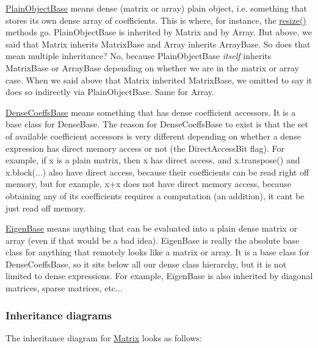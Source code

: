 \begin{DoxyItemize}
\item \hyperlink{class_eigen_1_1_plain_object_base}{Plain\+Object\+Base} means dense (matrix or array) plain object, i.\+e. something that stores its own dense array of coefficients. This is where, for instance, the \hyperlink{class_eigen_1_1_plain_object_base_a99d9054ee2d5a40c6e00ded0265e9cea}{resize() } methods go. {\ttfamily Plain\+Object\+Base} is inherited by {\ttfamily Matrix} and by {\ttfamily Array}. But above, we said that {\ttfamily Matrix} inherits {\ttfamily Matrix\+Base} and {\ttfamily Array} inherits {\ttfamily Array\+Base}. So does that mean multiple inheritance? No, because {\ttfamily Plain\+Object\+Base} {\itshape itself} inherits {\ttfamily Matrix\+Base} or {\ttfamily Array\+Base} depending on whether we are in the matrix or array case. When we said above that {\ttfamily Matrix} inherited {\ttfamily Matrix\+Base}, we omitted to say it does so indirectly via {\ttfamily Plain\+Object\+Base}. Same for {\ttfamily Array}.
\item \hyperlink{class_eigen_1_1_dense_coeffs_base}{Dense\+Coeffs\+Base} means something that has dense coefficient accessors. It is a base class for {\ttfamily Dense\+Base}. The reason for {\ttfamily Dense\+Coeffs\+Base} to exist is that the set of available coefficient accessors is very different depending on whether a dense expression has direct memory access or not (the {\ttfamily Direct\+Access\+Bit} flag). For example, if {\ttfamily x} is a plain matrix, then {\ttfamily x} has direct access, and {\ttfamily x.\+transpose()} and {\ttfamily x.\+block}(...) also have direct access, because their coefficients can be read right off memory, but for example, {\ttfamily x+x} does not have direct memory access, because obtaining any of its coefficients requires a computation (an addition), it can\textquotesingle{}t be just read off memory.
\item \hyperlink{group___core___module_struct_eigen_1_1_eigen_base}{Eigen\+Base} means anything that can be evaluated into a plain dense matrix or array (even if that would be a bad idea). {\ttfamily Eigen\+Base} is really the absolute base class for anything that remotely looks like a matrix or array. It is a base class for {\ttfamily Dense\+Coeffs\+Base}, so it sits below all our dense class hierarchy, but it is not limited to dense expressions. For example, {\ttfamily Eigen\+Base} is also inherited by diagonal matrices, sparse matrices, etc...
\end{DoxyItemize}\hypertarget{_topic_class_hierarchy_TopicClassHierarchyInheritanceDiagrams}{}\subsubsection{Inheritance diagrams}\label{_topic_class_hierarchy_TopicClassHierarchyInheritanceDiagrams}
The inheritance diagram for \hyperlink{group___core___module_class_eigen_1_1_matrix}{Matrix} looks as follows\+:


